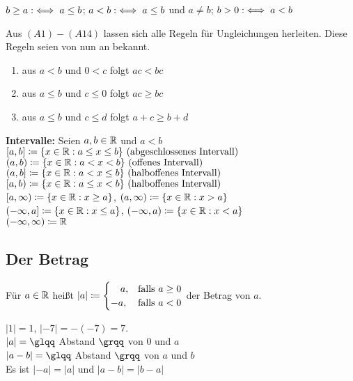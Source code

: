 \begin{schreibweisen}
$b \geq a :\iff a \leq b$; $a < b :\iff a \leq b$ und $a \neq b$; $b > 0 :\iff a < b$
\end{schreibweisen}


Aus \hyperref[k.axiom]{$(A1) - (A14)$} lassen sich alle Regeln für Ungleichungen herleiten. Diese Regeln seien von nun an bekannt.


\begin{beispiele*}
	\begin{enumerate}
		\item aus $a < b$ und $0 < c$ folgt $ac < bc$
		\item aus $a \leq b$ und $c \leq 0$ folgt $ac \geq bc$
		\item aus $a \leq b$ und $c \leq d$ folgt $a + c \geq b + d$
	\end{enumerate}
\end{beispiele*}


\textbf{Intervalle:}  Seien  $a, b \in \mathbb{R}$ und $a < b$ \\
$[a, b] \coloneqq \{ x \in \mathbb{R} : a \leq x \leq b \} \text{ (abgeschlossenes Intervall)}$ \\
$(a, b) \coloneqq \{ x \in \mathbb{R} : a < x < b \} \text{ (offenes Intervall)}$ \\
$(a, b] \coloneqq \{ x \in \mathbb{R} : a < x \leq b \} \text{ (halboffenes Intervall)}$ \\
$[a, b) \coloneqq \{ x \in \mathbb{R} : a \leq x < b \} \text{ (halboffenes Intervall)}$ \\
$[a, \infty) \coloneqq \{ x \in \mathbb{R} : x \geq a \}$, $(a , \infty) \coloneqq \{ x \in \mathbb{R} : x > a \}$ \\
$(-\infty, a] \coloneqq \{ x \in \mathbb{R} : x \leq a\}$, $(-\infty, a) \coloneqq \{ x \in \mathbb{R} : x < a\}$ \\
$(- \infty, \infty) \coloneqq \mathbb{R}$	


\subsection*{Der Betrag} 
Für $a \in \mathbb{R}$ hei{\ss}t $|a| \coloneqq \begin{cases} \hspace{0.35cm} a, & \text{falls } a \geq 0 \\ -a, & \text{falls } a < 0\end{cases}$ der Betrag von $a$.


\begin{beispiele*}
	$|1| = 1$, $|-7| = -(-7) = 7$. \\
	$|a| = \glqq$ Abstand $\grqq$ von $0$ und $a$ \\
	$|a - b| = \glqq$ Abstand $\grqq$ von $a$ und $b$ \\	
	Es ist $|-a| = |a|$ und $|a - b| = |b - a|$
\end{beispiele*}


